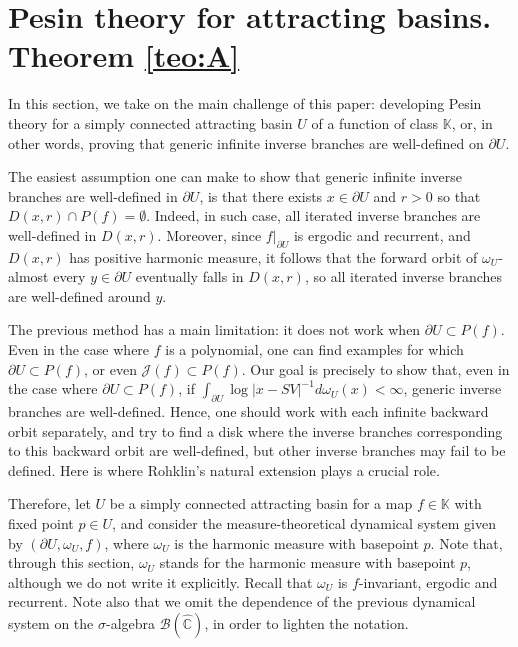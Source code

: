 \documentclass[11pt]{article}
\theoremstyle{definition}
\theoremstyle{remark}
\newcounter{main}
\theoremstyle{plain}
\begin{document}
\section{Pesin theory for attracting basins. Theorem \ref{teo:A}}\label{section-pesinA}

In this section, we take on the main challenge of this paper: developing Pesin theory for a simply connected attracting basin $ U $ of a function of class $ \mathbb{K} $, or, in other words, proving that generic infinite inverse branches are well-defined on $ \partial U $.

The easiest assumption one can make to  show that  generic infinite inverse branches are well-defined in $ \partial U $, is that there exists $ x\in\partial U $ and $ r>0 $ so that $ D(x,r)\cap P(f) =\emptyset$. Indeed, 
in such case, all iterated inverse branches are well-defined in $ D(x,r) $. Moreover, since $ f|_{\partial U} $ is ergodic and recurrent, and $ D(x,r) $ has positive harmonic measure, it follows that the forward orbit of $ \omega_U$-almost every $ y\in\partial U $ eventually falls in $ D(x,r) $, so all iterated inverse branches are well-defined around $ y $.


The previous method has a main limitation: it does not work when $ \partial U\subset P(f) $. Even in the case where $ f $ is a polynomial, one can find examples for which $ \partial U\subset P(f) $, or even $ \mathcal{J}(f)\subset P(f) $. Our goal is precisely to show that, even in the case where $ \partial U\subset P(f) $, if $ \int_{\partial U} \log\left| x-SV\right|^{-1} d\omega_U(x)<\infty  $, generic inverse branches are well-defined. Hence, one should work with each infinite backward orbit separately, and try to find a disk where the inverse branches corresponding to this backward orbit are well-defined, but other inverse branches may fail to be defined. Here is where Rohklin's natural extension plays a crucial role.

Therefore, let $ U $ be a simply connected attracting basin for a map $ f\in\mathbb{K} $ with fixed point $ p\in U $, and consider the measure-theoretical dynamical system given by $ (\partial U,  \omega_U, f) $, where $ \omega_U $ is the harmonic measure with basepoint $ p $. Note that, through this section, $ \omega_U $ stands for the harmonic measure with basepoint $ p $, although we do not write it explicitly. Recall that $ \omega_U $ is $ f $-invariant, ergodic and recurrent. Note also that we omit the dependence of the previous dynamical system on the $ \sigma $-algebra $ \mathcal{B}(\widehat{\mathbb{C}}) $, in order to lighten the notation. 
\end{document}
